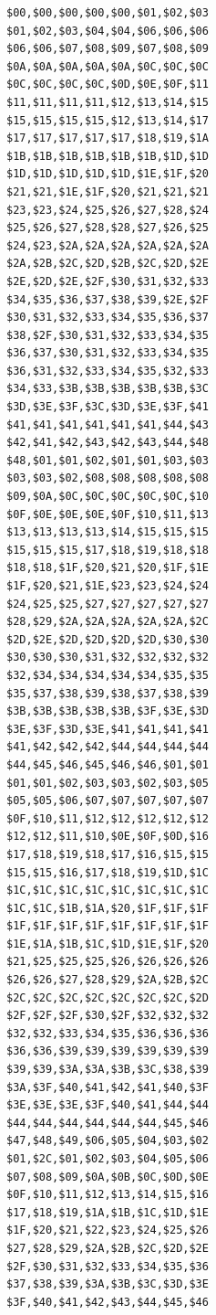 \clearpage
\blankpage
\begin{minipage}[b]{0.31\linewidth}
\centering
\begin{lstlisting}[basicstyle=\ttfamily\tiny, caption=X Positions]
$00,$00,$00,$00,$00,$01,$02,$03
$01,$02,$03,$04,$04,$06,$06,$06
$06,$06,$07,$08,$09,$07,$08,$09
$0A,$0A,$0A,$0A,$0A,$0C,$0C,$0C
$0C,$0C,$0C,$0C,$0D,$0E,$0F,$11
$11,$11,$11,$11,$12,$13,$14,$15
$15,$15,$15,$15,$12,$13,$14,$17
$17,$17,$17,$17,$17,$18,$19,$1A
$1B,$1B,$1B,$1B,$1B,$1B,$1D,$1D
$1D,$1D,$1D,$1D,$1D,$1E,$1F,$20
$21,$21,$1E,$1F,$20,$21,$21,$21
$23,$23,$24,$25,$26,$27,$28,$24
$25,$26,$27,$28,$28,$27,$26,$25
$24,$23,$2A,$2A,$2A,$2A,$2A,$2A
$2A,$2B,$2C,$2D,$2B,$2C,$2D,$2E
$2E,$2D,$2E,$2F,$30,$31,$32,$33
$34,$35,$36,$37,$38,$39,$2E,$2F
$30,$31,$32,$33,$34,$35,$36,$37
$38,$2F,$30,$31,$32,$33,$34,$35
$36,$37,$30,$31,$32,$33,$34,$35
$36,$31,$32,$33,$34,$35,$32,$33
$34,$33,$3B,$3B,$3B,$3B,$3B,$3C
$3D,$3E,$3F,$3C,$3D,$3E,$3F,$41
$41,$41,$41,$41,$41,$41,$44,$43
$42,$41,$42,$43,$42,$43,$44,$48
$48,$01,$01,$02,$01,$01,$03,$03
$03,$03,$02,$08,$08,$08,$08,$08
$09,$0A,$0C,$0C,$0C,$0C,$0C,$10
$0F,$0E,$0E,$0E,$0F,$10,$11,$13
$13,$13,$13,$13,$14,$15,$15,$15
$15,$15,$15,$17,$18,$19,$18,$18
$18,$18,$1F,$20,$21,$20,$1F,$1E
$1F,$20,$21,$1E,$23,$23,$24,$24
$24,$25,$25,$27,$27,$27,$27,$27
$28,$29,$2A,$2A,$2A,$2A,$2A,$2C
$2D,$2E,$2D,$2D,$2D,$2D,$30,$30
$30,$30,$30,$31,$32,$32,$32,$32
$32,$34,$34,$34,$34,$34,$35,$35
$35,$37,$38,$39,$38,$37,$38,$39
$3B,$3B,$3B,$3B,$3B,$3F,$3E,$3D
$3E,$3F,$3D,$3E,$41,$41,$41,$41
$41,$42,$42,$42,$44,$44,$44,$44
$44,$45,$46,$45,$46,$46,$01,$01
$01,$01,$02,$03,$03,$02,$03,$05
$05,$05,$06,$07,$07,$07,$07,$07
$0F,$10,$11,$12,$12,$12,$12,$12
$12,$12,$11,$10,$0E,$0F,$0D,$16
$17,$18,$19,$18,$17,$16,$15,$15
$15,$15,$16,$17,$18,$19,$1D,$1C
$1C,$1C,$1C,$1C,$1C,$1C,$1C,$1C
$1C,$1C,$1B,$1A,$20,$1F,$1F,$1F
$1F,$1F,$1F,$1F,$1F,$1F,$1F,$1F
$1E,$1A,$1B,$1C,$1D,$1E,$1F,$20
$21,$25,$25,$25,$26,$26,$26,$26
$26,$26,$27,$28,$29,$2A,$2B,$2C
$2C,$2C,$2C,$2C,$2C,$2C,$2C,$2D
$2F,$2F,$2F,$30,$2F,$32,$32,$32
$32,$32,$33,$34,$35,$36,$36,$36
$36,$36,$39,$39,$39,$39,$39,$39
$39,$39,$3A,$3A,$3B,$3C,$38,$39
$3A,$3F,$40,$41,$42,$41,$40,$3F
$3E,$3E,$3E,$3F,$40,$41,$44,$44
$44,$44,$44,$44,$44,$44,$45,$46
$47,$48,$49,$06,$05,$04,$03,$02
$01,$2C,$01,$02,$03,$04,$05,$06
$07,$08,$09,$0A,$0B,$0C,$0D,$0E
$0F,$10,$11,$12,$13,$14,$15,$16
$17,$18,$19,$1A,$1B,$1C,$1D,$1E
$1F,$20,$21,$22,$23,$24,$25,$26
$27,$28,$29,$2A,$2B,$2C,$2D,$2E
$2F,$30,$31,$32,$33,$34,$35,$36
$37,$38,$39,$3A,$3B,$3C,$3D,$3E
$3F,$40,$41,$42,$43,$44,$45,$46
\end{lstlisting}
\end{minipage}
